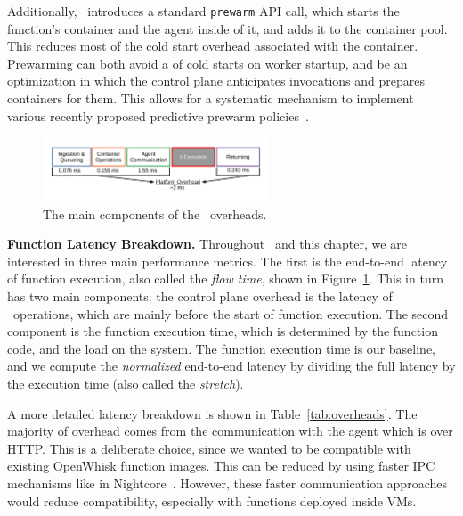 Additionally, \sysname~introduces a standard \texttt{prewarm}  API call, which starts the function's container and the agent inside of it, and adds it to the container pool.
This reduces most of the cold start overhead associated with the container.
Prewarming can both avoid a  of cold starts on worker startup, and be an optimization in which the control plane anticipates invocations and prepares containers for them. 
This allows for a systematic mechanism to implement various recently proposed predictive prewarm policies~\cite{roy2022icebreaker, shahrad_serverless_2020, silva_prebaking_2020}. 





\begin{figure}
\centering 
\includegraphics[width=0.6\textwidth]{iluvatar/figs/OverheadTimeline.pdf}
\caption{The main components of the \sysname~overheads.}
\label{fig:timeline-flow}
\end{figure}


\noindent \textbf{Function Latency Breakdown.}
Throughout \sysname~and this chapter, we are interested in three main performance metrics. 
The first is the end-to-end latency of function execution, also called the \emph{flow time}, shown in Figure~\ref{fig:timeline-flow}.
This in turn has two main components: the control plane overhead is the latency of \sysname~operations, which are mainly before the start of function execution.
The second component is the function execution time, which is determined by the function code, and the load on the system.
The function execution time is our baseline, and we compute the \emph{normalized} end-to-end latency by dividing the full latency by the execution time (also called the \emph{stretch}). 

A more detailed latency breakdown is shown in Table~\ref{tab:overheads}.
The majority of overhead comes from the communication with the agent which is over HTTP. 
This is a deliberate choice, since we wanted to be compatible with existing OpenWhisk function images.
This can be reduced by using faster IPC mechanisms like in Nightcore~\cite{jia2021nightcore}. 
However, these faster communication approaches would reduce compatibility, especially with functions deployed inside VMs.

